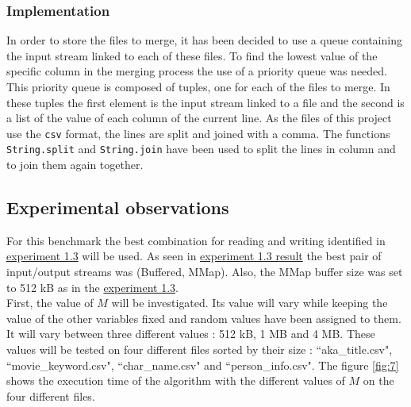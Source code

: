 \documentclass[12pt]{article}
\begin{document}
\subsubsection{Implementation}
In order to store the files to merge, it has been decided to use a queue containing the input stream linked to each of these files.
To find the lowest value of the specific column in the merging process the use of a priority queue was needed. This priority queue is composed of tuples, one for each of the files to merge. In these tuples the first element is the input stream linked to a file and the second is a list of the value of each column of the current line.
As the files of this project use the \texttt{csv} format, the lines are split and joined with a comma.
The functions \texttt{String.split} and \texttt{String.join} have been used to split the lines in column and to join them again together. 
 
\subsection{Experimental observations}
For this benchmark the best combination for reading and writing identified in \hyperref[exp1.3]{experiment 1.3} will be used. As seen in \hyperref[res1.3]{experiment 1.3 result} the best pair of input/output streams was (Buffered, MMap). Also, the MMap buffer size was set to 512 kB as in the \hyperref[exp1.3]{experiment 1.3}.\\

First, the value of $M$ will be investigated. Its value will vary while keeping the value of the other variables fixed and random values have been assigned to them. It will vary between three different values : 512 kB, 1 MB and 4 MB. These values will be tested on four different files sorted by their size : ``aka\_title.csv", ``movie\_keyword.csv", ``char\_name.csv" and ``person\_info.csv". The figure \ref{fig:7} shows the execution time of the algorithm with the different values of $M$ on the four different files.
\end{document}

